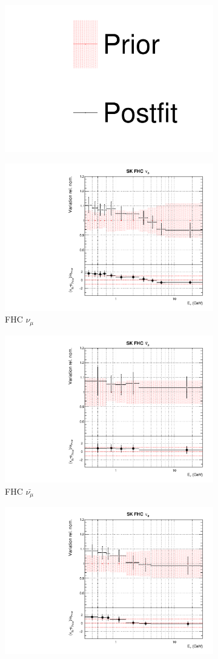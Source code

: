 \begin{figure}[!htbp]
\centering
\begin{subfigure}{0.8\textwidth}
  \centering
  \includegraphics[width=0.24\linewidth]{figs/dat_leg}
\end{subfigure}
\begin{subfigure}{0.45\textwidth}
  \centering
  \includegraphics[width=0.75\linewidth]{figs/datflux8}
  \caption{\SK FHC $\nu_{\mu}$}
\end{subfigure}
\begin{subfigure}{0.45\textwidth}
  \centering
  \includegraphics[width=0.75\linewidth]{figs/datflux9}
  \caption{\SK FHC $\bar{\nu_{\mu}}$}
\end{subfigure}
\begin{subfigure}{0.45\textwidth}
  \centering
  \includegraphics[width=0.75\linewidth]{figs/datflux10}

\end{subfigure}
\end{figure}
